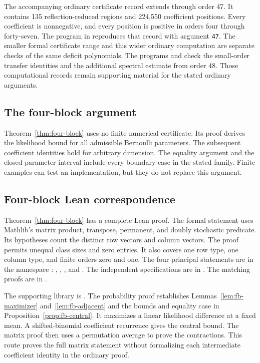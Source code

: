 \documentclass[11pt,a4paper]{article}
\theoremstyle{definition}
\theoremstyle{remark}
\begin{document}
The accompanying ordinary certificate record extends through order 47.
It contains 135 reflection-reduced regions and 224,550 coefficient positions.
Every coefficient is nonnegative, and every position is positive in orders four through forty-seven.
The program  in
 reproduces that record with argument \texttt{47}.
The smaller formal certificate range and this wider ordinary computation are separate checks of the same deficit polynomials.
The programs  and  check the small-order transfer identities and the additional spectral estimate from order 48.
Those computational records remain supporting material for the stated ordinary arguments.

\subsection{The four-block argument}

Theorem~\ref{thm:four-block} uses no finite numerical certificate.
Its proof derives the likelihood bound for all admissible Bernoulli parameters.
The subsequent coefficient identities hold for arbitrary dimension.
The equality argument and the closed parameter interval include every boundary case in the stated family.
Finite examples can test an implementation, but they do not replace this argument.

\subsection{Four-block Lean correspondence}

Theorem~\ref{thm:four-block} has a complete Lean proof.
The formal statement uses Mathlib's matrix product, transpose, permanent, and doubly stochastic predicate.
Its hypotheses count the distinct row vectors and column vectors.
The proof permits unequal class sizes and zero entries.
It also covers one row type, one column type, and finite orders zero and one.
The four principal statements are in the namespace
:
, , , and .
The independent specifications are in
.
The matching proofs are in
.

The supporting library is
.
The probability proof establishes Lemmas~\ref{lem:fb-maximizer} and~\ref{lem:fb-adjacent}
and the bounds and equality case in Proposition~\ref{prop:fb-central}.
It maximizes a linear likelihood difference at a fixed mean.
A shifted-binomial coefficient recurrence gives the central bound.
The matrix proof then uses a permutation average to prove the contractions.
This route proves the full matrix statement without formalizing each intermediate coefficient identity in the ordinary proof.
\end{document}
